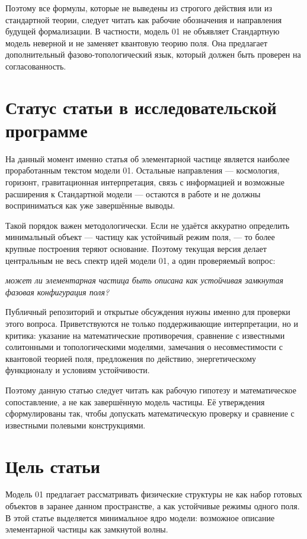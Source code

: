 \documentclass[11pt,a4paper]{article}
\begin{document}
Поэтому все формулы, которые не выведены из строгого действия или из стандартной теории, следует читать как рабочие обозначения и направления будущей формализации. В частности, модель 01 не объявляет Стандартную модель неверной и не заменяет квантовую теорию поля. Она предлагает дополнительный фазово-топологический язык, который должен быть проверен на согласованность.

\section{Статус статьи в исследовательской программе}

На данный момент именно статья об элементарной частице является наиболее проработанным текстом модели 01. Остальные направления --- космология, горизонт, гравитационная интерпретация, связь с информацией и возможные расширения к Стандартной модели --- остаются в работе и не должны восприниматься как уже завершённые выводы.

Такой порядок важен методологически. Если не удаётся аккуратно определить минимальный объект --- частицу как устойчивый режим поля, --- то более крупные построения теряют основание. Поэтому текущая версия делает центральным не весь спектр идей модели 01, а один проверяемый вопрос:
\begin{center}
\textit{может ли элементарная частица быть описана как устойчивая замкнутая фазовая конфигурация поля?}
\end{center}

Публичный репозиторий и открытые обсуждения нужны именно для проверки этого вопроса. Приветствуются не только поддерживающие интерпретации, но и критика: указание на математические противоречия, сравнение с известными солитонными и топологическими моделями, замечания о несовместимости с квантовой теорией поля, предложения по действию, энергетическому функционалу и условиям устойчивости.

Поэтому данную статью следует читать как рабочую гипотезу и математическое сопоставление, а не как завершённую модель частицы. Её утверждения сформулированы так, чтобы допускать математическую проверку и сравнение с известными полевыми конструкциями.

\section{Цель статьи}

Модель 01 предлагает рассматривать физические структуры не как набор готовых объектов в заранее данном пространстве, а как устойчивые режимы одного поля. В этой статье выделяется минимальное ядро модели: возможное описание элементарной частицы как замкнутой волны.
\end{document}
